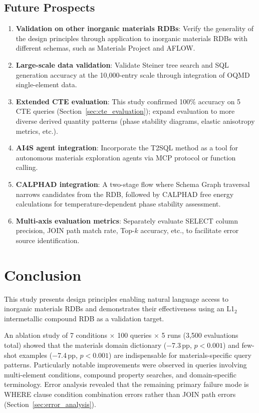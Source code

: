 \documentclass{npj-compt.mater}
\begin{document}
\subsection{Future Prospects}

\begin{enumerate}
  \item \textbf{Validation on other inorganic materials RDBs}:
    Verify the generality of the design principles through
    application to inorganic materials RDBs with different schemas,
    such as Materials Project and AFLOW.
  \item \textbf{Large-scale data validation}:
    Validate Steiner tree search and SQL generation accuracy at
    the 10{,}000-entry scale through integration of OQMD
    single-element data.
  \item \textbf{Extended CTE evaluation}:
    This study confirmed 100\% accuracy on 5 CTE queries
    (Section~\ref{sec:cte_evaluation}); expand evaluation to more
    diverse derived quantity patterns (phase stability diagrams,
    elastic anisotropy metrics, etc.).
  \item \textbf{AI4S agent integration}:
    Incorporate the T2SQL method as a tool for autonomous materials
    exploration agents via MCP protocol or function calling.
  \item \textbf{CALPHAD integration}:
    A two-stage flow where Schema Graph traversal narrows
    candidates from the RDB, followed by CALPHAD free energy
    calculations for temperature-dependent phase stability
    assessment.
  \item \textbf{Multi-axis evaluation metrics}:
    Separately evaluate SELECT column precision, JOIN path match
    rate, Top-$k$ accuracy, etc., to facilitate error source
    identification.
\end{enumerate}

\section{Conclusion}
\label{sec:conclusion}

This study presents design principles enabling natural language
access to inorganic materials RDBs and demonstrates their
effectiveness using an L1$_2$ intermetallic compound RDB as a
validation target.

An ablation study of 7 conditions $\times$ 100 queries $\times$
5 runs (3{,}500 evaluations total) showed that the materials
domain dictionary ($-$7.3\,pp, $p<0.001$) and few-shot examples
($-$7.4\,pp, $p<0.001$) are indispensable for materials-specific
query patterns.
Particularly notable improvements were observed in queries
involving multi-element conditions, compound property searches,
and domain-specific terminology.
Error analysis revealed that the remaining primary failure mode
is WHERE clause condition combination errors rather than JOIN path
errors (Section~\ref{sec:error_analysis}).
\end{document}
